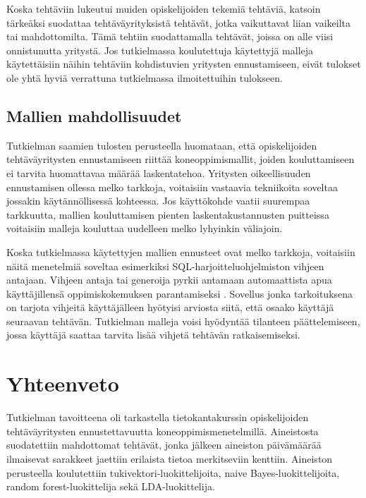 \documentclass[finnish,twoside,openright]{HYgraduMLDS}
\begin{document}
Koska tehtäviin lukeutui muiden opiskelijoiden tekemiä tehtäviä, katsoin tärkeäksi suodattaa tehtäväyrityksistä tehtävät, jotka vaikuttavat liian vaikeilta tai mahdottomilta. Tämä tehtiin suodattamalla tehtävät, joissa on alle viisi onnistunutta yritystä. Jos tutkielmassa koulutettuja käytettyjä malleja käytettäisiin näihin tehtäviin kohdistuvien yritysten ennustamiseen, eivät tulokset ole yhtä hyviä verrattuna tutkielmassa ilmoitettuihin tulokseen.


\section{Mallien mahdollisuudet}

Tutkielman saamien tulosten perusteella huomataan, että opiskelijoiden tehtäväyritysten ennustamiseen riittää koneoppimismallit, joiden kouluttamiseen ei tarvita huomattavaa määrää laskentatehoa. Yritysten oikeellisuuden ennustamisen ollessa melko tarkkoja, voitaisiin vastaavia tekniikoita soveltaa jossakin käytännöllisessä kohteessa. Jos käyttökohde vaatii suurempaa tarkkuutta, mallien kouluttamisen pienten laskentakustannusten puitteissa voitaisiin malleja kouluttaa uudelleen melko lyhyinkin väliajoin.

Koska tutkielmassa käytettyjen mallien ennusteet ovat melko tarkkoja, voitaisiin näitä menetelmiä soveltaa esimerkiksi SQL-harjoitteluohjelmiston vihjeen antajaan. Vihjeen antaja tai generoija pyrkii antamaan automaattista apua käyttäjillensä oppimiskokemuksen parantamiseksi \cite{lavbivc2017recommender}. Sovellus jonka tarkoituksena on tarjota vihjeitä käyttäjälleen hyötyisi arviosta siitä, että osaako käyttäjä seuraavan tehtävän. Tutkielman malleja voisi hyödyntää tilanteen päättelemiseen, jossa käyttäjä saattaa tarvita lisää vihjetä tehtävän ratkaisemiseksi.


\chapter{Yhteenveto\label{chapter:Yhteenveto}}

Tutkielman tavoitteena oli tarkastella tietokantakurssin opiskelijoiden tehtäväyritysten ennustettavuutta koneoppimismenetelmillä. Aineistosta suodatettiin mahdottomat tehtävät, jonka jälkeen aineiston päivämäärää ilmaisevat sarakkeet jaettiin erilaista tietoa merkitseviin kenttiin. Aineiston perusteella koulutettiin tukivektori-luokittelijoita, naive Bayes-luokittelijoita, random forest-luokittelija sekä LDA-luokittelija. 
\end{document}
